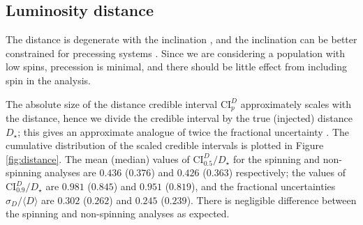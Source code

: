 \subsection{Luminosity distance}\label{sec:distance}

The distance is degenerate with the inclination \citep{Cutler_1994,Aasi_2013}, and the inclination can be better constrained for precessing systems \citep{van_der_Sluys_2008,Vitale_2014}. Since we are considering a population with low spins, precession is minimal, and there should be little effect from including spin in the analysis.

The absolute size of the distance credible interval $\mathrm{CI}_p^{D}$ approximately scales with the distance, hence we divide the credible interval by the true (injected) distance $D_\star$; this gives an approximate analogue of twice the fractional uncertainty \citep{Berry_2014}. The cumulative distribution of the scaled credible intervals is plotted in Figure \ref{fig:distance}. The mean (median) values of $\mathrm{CI}_{0.5}^{D}/D_\star$ for the spinning and non-spinning analyses are $0.436$ ($0.376$) and $0.426$ ($0.363$) respectively; the values of $\mathrm{CI}_{0.9}^{D}/D_\star$ are $0.981$ ($0.845$) and $0.951$ ($0.819$), and the fractional uncertainties $\sigma_D/\langle D\rangle$ are $0.302$ ($0.262$) and $0.245$ ($0.239$). There is negligible difference between the spinning and non-spinning analyses as expected.


  
  
  
  
  